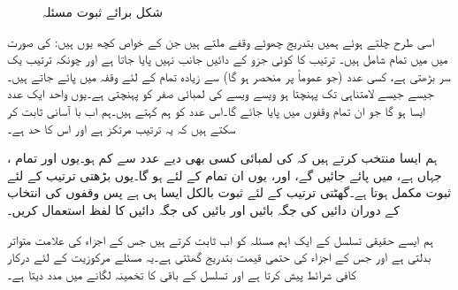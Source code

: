 \begin{figure}
\centering
{}
\caption{شکل برائے ثبوت مسئلہ }
\label{شکل_مسئلہ_ترتیب_حقیقی_ترتیب_مرکوزیت}
\end{figure}

اسی طرح چلتے ہوئے  ہمیں بتدریج چھوٹے وقفے  ملتے ہیں جن کے خواص کچھ یوں ہیں:  کی صورت میں   میں تمام  شامل ہیں۔ ترتیب کا کوئی جزو  کے دائیں جانب نہیں پایا جاتا ہے اور چونکہ ترتیب یک سر بڑھتی ہے، کسی عدد  (جو عموماً  پر منحصر ہو گا) سے زیادہ تمام  کے لئے  وقفہ  میں پائے جاتے ہیں۔جیسے جیسے  لامتناہی تک پہنچتا ہو ویسے ویسے  کی لمبائی صفر کو پہنچتی ہے۔یوں واحد ایک عدد ایسا ہو گا جو ان تمام وقفوں میں پایا جائے گا۔اس عدد کو ہم  کہتے ہیں۔ہم اب با آسانی ثابت کر سکتے ہیں کہ یہ ترتیب مرتکز ہے اور اس کا حد  ہے۔

ہم ایسا  منتخب کرتے ہیں کہ  کی لمبائی کسی بھی دیے عدد  سے کم ہو۔یوں  اور تمام ، جہاں  ہے،  میں پائے جائیں گے، اور، یوں ان تمام  کے لئے  ہو گا۔یوں بڑھتی ترتیب کے لئے ثبوت مکمل ہوتا ہے۔گھٹتی ترتیب کے لئے ثبوت بالکل ایسا ہی ہے پس وقفوں کی انتخاب کے دوران دائیں کی جگہ بائیں اور بائیں کی جگہ دائیں کا لفظ استعمال کریں۔

ہم ایسے حقیقی تسلسل کے ایک اہم مسئلہ کو اب ثابت کرتے ہیں جس کے اجزاء کی علامت متواتر بدلتی ہے اور جس کے اجزاء کی حتمی قیمت بتدریج گھٹتی ہے۔یہ مسئلے مرکوزیت کے لئے درکار کافی شرائط پیش کرتا ہے اور تسلسل کے باقی کا تخمینہ لگانے میں مدد دیتا ہے۔

\quad {}\\

